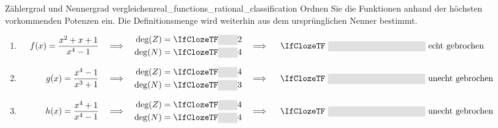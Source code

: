 \begin{minipage}{\linewidth}
\begin{ExampleBox}{Zählergrad und Nennergrad vergleichen}{real_functions_rational_classification}
  Ordnen Sie die Funktionen anhand der höchsten vorkommenden Potenzen ein.
  Die Definitionsmenge wird weiterhin aus dem ursprünglichen Nenner bestimmt.
  \begin{enumerate}[label=\alph*),itemsep=0.8\baselineskip]
    \item \(\displaystyle
        \mathmakebox[3.2cm][r]{f(x)=\frac{x^2+x+1}{x^4-1}}\quad\Longrightarrow\quad
        \begin{aligned}
          \deg(Z)&=\Cloze{0.8cm}{2}\\
          \deg(N)&=\Cloze{0.8cm}{4}
        \end{aligned}\quad\Longrightarrow\quad
        \text{\Cloze{4cm}{echt gebrochen}}
      \)
    \item \(\displaystyle
        \mathmakebox[3.2cm][r]{g(x)=\frac{x^4-1}{x^3+1}}\quad\Longrightarrow\quad
        \begin{aligned}
          \deg(Z)&=\Cloze{0.8cm}{4}\\
          \deg(N)&=\Cloze{0.8cm}{3}
        \end{aligned}\quad\Longrightarrow\quad
        \text{\Cloze{4cm}{unecht gebrochen}}
      \)
    \item \(\displaystyle
        \mathmakebox[3.2cm][r]{h(x)=\frac{x^4+1}{x^4-1}}\quad\Longrightarrow\quad
        \begin{aligned}
          \deg(Z)&=\Cloze{0.8cm}{4}\\
          \deg(N)&=\Cloze{0.8cm}{4}
        \end{aligned}\quad\Longrightarrow\quad
        \text{\Cloze{4cm}{unecht gebrochen}}
      \)
  \end{enumerate}
\end{ExampleBox}
\end{minipage}
